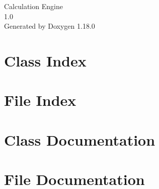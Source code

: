 \documentclass[twoside]{book}
\newcommand{\+}{\discretionary{\mbox{\scriptsize$\hookleftarrow$}}{}{}}
\newcommand{\clearemptydoublepage}{%
    \newpage{\pagestyle{empty}\cleardoublepage}%
  }
\begin{document}
  \raggedbottom
    \hypersetup{pageanchor=false,
                bookmarksnumbered=true,
                pdfencoding=unicode
               }
  \begin{titlepage}
  \vspace*{7cm}
  \begin{center}%
  {\Large Calculation Engine}\\
  [1ex]\large 1.\+0 \\
  \vspace*{1cm}
  {\large Generated by Doxygen 1.18.0}\\
  \end{center}
  \end{titlepage}
  \clearemptydoublepage
  \tableofcontents
  \clearemptydoublepage
  \hypersetup{pageanchor=true}


\chapter{Class Index}

\chapter{File Index}

\chapter{Class Documentation}


\chapter{File Documentation}






  \backmatter
  \newpage
  \clearemptydoublepage
  \printindex
\end{document}
